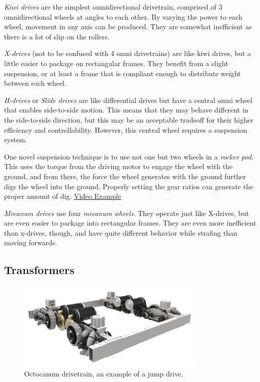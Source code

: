 \documentclass[10pt,letterpaper]{book}
\begin{document}
\begin{asparaenum}[a)]
	\item \textit{Kiwi drives} are the simplest omnidirectional drivetrain, comprised of 3 omnidirectional wheels at angles to each other. By varying the power to each wheel, movement in any axis can be produced. They are somewhat inefficient as there is a lot of slip on the rollers.
	\item \textit{X-drives} (not to be confused with 4 omni drivetrains) are like kiwi drives, but a little easier to package on rectangular frames. They benefit from a slight suspension, or at least a frame that is compliant enough to distribute weight between each wheel.
	\item \textit{H-drives} or \textit{Slide drives} are like differential drives but have a central omni wheel that enables side-to-side motion. This means that they may behave different in the side-to-side direction, but this may be an acceptable tradeoff for their higher efficiency and controllability. However, this central wheel requires a suspension system.
	
	One novel suspension technique is to use not one but two wheels in a \textit{rocker pod}. This uses the torque from the driving motor to engage the wheel with the ground, and from there, the force the wheel generates with the ground further digs the wheel into the ground. Properly setting the gear ratios can generate the proper amount of dig. \href{https://www.youtube.com/watch?v=YBUEhrsC9Es}{\color{red}\underline{Video Example}}
	\item \textit{Mecanum drives} use four \textit{mecanum wheels}. They operate just like X-drives, but are even easier to package into rectangular frames. They are even more inefficient than x-drives, though, and have quite different behavior while strafing than moving forwards.
\end{asparaenum}

\subsection{Transformers}

\begin{figure}[H]
	\includegraphics[width=0.8\textwidth]{imgs/drivetrain_octocanum.png}
	\caption{Octocanum drivetrain, an example of a jump drive.}
\end{figure}
\end{document}
